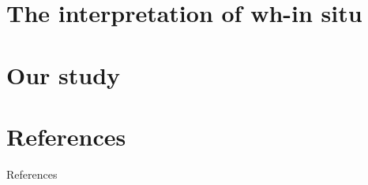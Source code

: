 \documentclass[aspectratio=169, sectionpages, codemintedoverleaf, bibref]{beamer}
\begin{document}
\section{The interpretation of wh-in situ}

%
%

\section{Our study}

%

%

%

\section{References}

\begin{frame}[allowframebreaks]{References}
\end{frame}
\end{document}
